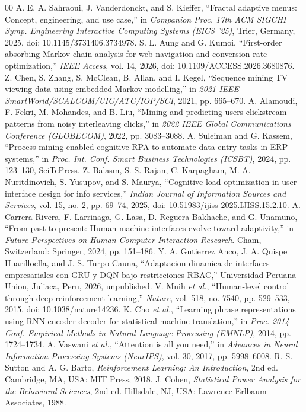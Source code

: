 \documentclass[conference]{IEEEtran}
\begin{document}
\begin{thebibliography}{00}
 A. E. A. Sahraoui, J. Vanderdonckt, and S. Kieffer, ``Fractal adaptive menus: Concept, engineering, and use case,'' in \textit{Companion Proc. 17th ACM SIGCHI Symp. Engineering Interactive Computing Systems (EICS '25)}, Trier, Germany, 2025, doi: 10.1145/3731406.3734978.
 S. L. Aung and G. Kumoi, ``First-order absorbing Markov chain analysis for web navigation and conversion rate optimization,'' \textit{IEEE Access}, vol. 14, 2026, doi: 10.1109/ACCESS.2026.3680876.
 Z. Chen, S. Zhang, S. McClean, B. Allan, and I. Kegel, ``Sequence mining TV viewing data using embedded Markov modelling,'' in \textit{2021 IEEE SmartWorld/SCALCOM/UIC/ATC/IOP/SCI}, 2021, pp. 665--670.
 A. Alamoudi, F. Fekri, M. Mohandes, and B. Liu, ``Mining and predicting users clickstream patterns from noisy interleaving clicks,'' in \textit{2022 IEEE Global Communications Conference (GLOBECOM)}, 2022, pp. 3083--3088.
 A. Suleiman and G. Kassem, ``Process mining enabled cognitive RPA to automate data entry tasks in ERP systems,'' in \textit{Proc. Int. Conf. Smart Business Technologies (ICSBT)}, 2024, pp. 123--130, SciTePress.
 Z. Balasm, S. S. Rajan, C. Karpagham, M. A. Nuritdinovich, S. Yusupov, and S. Maurya, ``Cognitive load optimization in user interface design for info services,'' \textit{Indian Journal of Information Sources and Services}, vol. 15, no. 2, pp. 69--74, 2025, doi: 10.51983/ijiss-2025.IJISS.15.2.10.
 A. Carrera-Rivera, F. Larrinaga, G. Lasa, D. Reguera-Bakhache, and G. Unamuno, ``From past to present: Human-machine interfaces evolve toward adaptivity,'' in \textit{Future Perspectives on Human-Computer Interaction Research}. Cham, Switzerland: Springer, 2024, pp. 151--186.
 Y. A. Gutierrez Anco, J. A. Quispe Huarilloclla, and J. S. Turpo Cauna, ``Adaptacion dinamica de interfaces empresariales con GRU y DQN bajo restricciones RBAC,'' Universidad Peruana Union, Juliaca, Peru, 2026, unpublished.
 V. Mnih \textit{et al.}, ``Human-level control through deep reinforcement learning,'' \textit{Nature}, vol. 518, no. 7540, pp. 529--533, 2015, doi: 10.1038/nature14236.
 K. Cho \textit{et al.}, ``Learning phrase representations using RNN encoder-decoder for statistical machine translation,'' in \textit{Proc. 2014 Conf. Empirical Methods in Natural Language Processing (EMNLP)}, 2014, pp. 1724--1734.
 A. Vaswani \textit{et al.}, ``Attention is all you need,'' in \textit{Advances in Neural Information Processing Systems (NeurIPS)}, vol. 30, 2017, pp. 5998--6008.
 R. S. Sutton and A. G. Barto, \textit{Reinforcement Learning: An Introduction}, 2nd ed. Cambridge, MA, USA: MIT Press, 2018.
 J. Cohen, \textit{Statistical Power Analysis for the Behavioral Sciences}, 2nd ed. Hillsdale, NJ, USA: Lawrence Erlbaum Associates, 1988.
\end{thebibliography}
\end{document}
